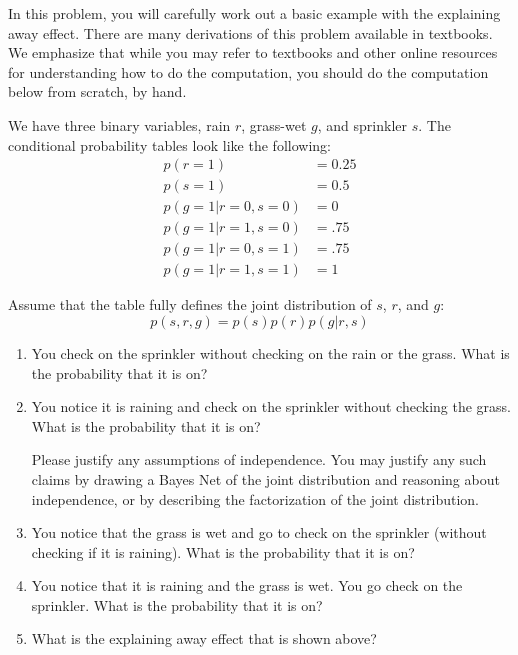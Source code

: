 \documentclass[submit]{harvardml}
\begin{document}
\begin{problem}

  In this problem, you will carefully work out a basic example with
  the explaining away effect. There are many derivations of this
  problem available in textbooks. We emphasize that while you may
  refer to textbooks and other online resources for understanding how
  to do the computation, you should do the computation below from
  scratch, by hand.

  We have three binary variables, rain $r$, grass-wet $g$, and
  sprinkler $s$.  The conditional probability tables look like the
  following:
  \begin{eqnarray*}
    p(r = 1) &= 0.25 \\
    p(s = 1) &= 0.5 \\
    p(g = 1 | r = 0 , s = 0 ) &= 0 \\
    p(g = 1 | r = 1 , s = 0 ) &= .75 \\
    p(g = 1 | r = 0 , s = 1 ) &= .75 \\
    p(g = 1 | r = 1 , s = 1 ) &= 1
  \end{eqnarray*}
  
  Assume that the table fully defines the joint distribution of $s$, $r$, and $g$: 
  $$p(s, r, g) = p(s) p(r) p(g | r, s)$$

  \begin{enumerate}
    \item You check on the sprinkler without checking on the rain or
      the grass. What is the probability that it is on?
    \item You notice it is raining and check on the sprinkler without
      checking the grass.  What is the probability that it is on?
      
      Please justify any assumptions of independence.  You may justify any such claims by drawing a Bayes Net of the joint distribution and reasoning about independence, or by describing the factorization of the joint distribution.
    \item You notice that the grass is wet and go to check on the
      sprinkler (without checking if it is raining).  What is the
      probability that it is on?
    \item You notice that it is raining and the grass is wet.  You go
      check on the sprinkler.  What is the probability that it is on?
    \item What is the explaining away effect that is shown above?
    \end{enumerate}

\end{problem}
\end{document}
